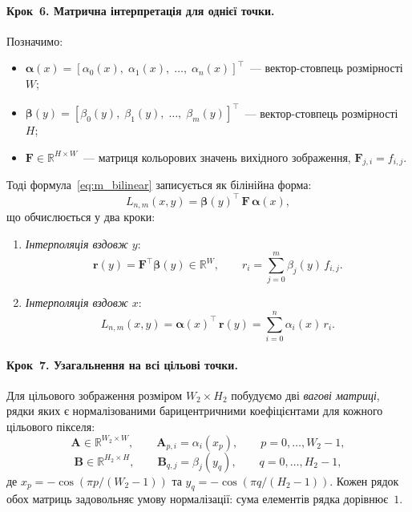 \paragraph{Крок~6. Матрична інтерпретація для однієї точки.}
Позначимо:
\begin{itemize}
	\item $\boldsymbol{\alpha}(x) = [\alpha_0(x),\; \alpha_1(x),\; \ldots,\; \alpha_n(x)]^{\!\top}$~--- вектор-стовпець розмірності $W$;
	\item $\boldsymbol{\beta}(y) = [\beta_0(y),\; \beta_1(y),\; \ldots,\; \beta_m(y)]^{\!\top}$~--- вектор-стовпець розмірності $H$;
	\item $\mathbf{F} \in \mathbb{R}^{H \times W}$~--- матриця кольорових значень вихідного зображення, $\mathbf{F}_{j,i} = f_{i,j}$.
\end{itemize}
Тоді формула~\eqref{eq:m_bilinear} записується як білінійна форма:
\begin{equation}\label{eq:m_bilinear_vec}
	L_{n,m}(x, y) = \boldsymbol{\beta}(y)^{\!\top}\,\mathbf{F}\, \boldsymbol{\alpha}(x),
\end{equation}
що обчислюється у два кроки:
\begin{enumerate}
	\item \textit{Інтерполяція вздовж $y$}:
	\begin{equation}\label{eq:m_pass1_vec}
		\mathbf{r}(y) = \mathbf{F}^{\!\top} \boldsymbol{\beta}(y) \in \mathbb{R}^{W}, \qquad
		r_i = \sum\limits_{j=0}^{m} \beta_j(y)\, f_{i,j}.
	\end{equation}
	\item \textit{Інтерполяція вздовж $x$}:
	\begin{equation}\label{eq:m_pass2_vec}
		L_{n,m}(x, y) = \boldsymbol{\alpha}(x)^{\!\top}\, \mathbf{r}(y) = \sum\limits_{i=0}^{n} \alpha_i(x)\, r_i.
	\end{equation}
\end{enumerate}

\paragraph{Крок~7. Узагальнення на всі цільові точки.}
Для цільового зображення розміром $W_2 \times H_2$ побудуємо дві \textit{вагові матриці}, рядки яких є нормалізованими барицентричними коефіцієнтами для кожного цільового пікселя:
\begin{equation}\label{eq:m_matrix_A}
	\mathbf{A} \in \mathbb{R}^{W_2 \times W}, \qquad \mathbf{A}_{p,i} = \alpha_i(x_p), \qquad p = 0, \ldots, W_2 - 1,
\end{equation}
\begin{equation}\label{eq:m_matrix_B}
	\mathbf{B} \in \mathbb{R}^{H_2 \times H}, \qquad \mathbf{B}_{q,j} = \beta_j(y_q), \qquad q = 0, \ldots, H_2 - 1,
\end{equation}
де $x_p = -\cos(\pi p / (W_2 - 1))$ та $y_q = -\cos(\pi q / (H_2 - 1))$. Кожен рядок обох матриць задовольняє умову нормалізації: сума елементів рядка дорівнює~$1$.

